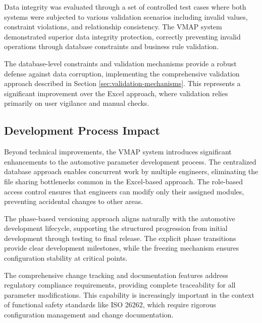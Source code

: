 Data integrity was evaluated through a set of controlled test cases where both systems were subjected to various validation scenarios including invalid values, constraint violations, and relationship consistency. The VMAP system demonstrated superior data integrity protection, correctly preventing invalid operations through database constraints and business rule validation.

The database-level constraints and validation mechanisms provide a robust defense against data corruption, implementing the comprehensive validation approach described in Section \ref{sec:validation-mechanisms}. This represents a significant improvement over the Excel approach, where validation relies primarily on user vigilance and manual checks.

\subsection{Development Process Impact}
\label{subsec:development-process-impact}

Beyond technical improvements, the VMAP system introduces significant enhancements to the automotive parameter development process. The centralized database approach enables concurrent work by multiple engineers, eliminating the file sharing bottlenecks common in the Excel-based approach. The role-based access control ensures that engineers can modify only their assigned modules, preventing accidental changes to other areas.

The phase-based versioning approach aligns naturally with the automotive development lifecycle, supporting the structured progression from initial development through testing to final release. The explicit phase transitions provide clear development milestones, while the freezing mechanism ensures configuration stability at critical points.

The comprehensive change tracking and documentation features address regulatory compliance requirements, providing complete traceability for all parameter modifications. This capability is increasingly important in the context of functional safety standards like ISO 26262, which require rigorous configuration management and change documentation.

